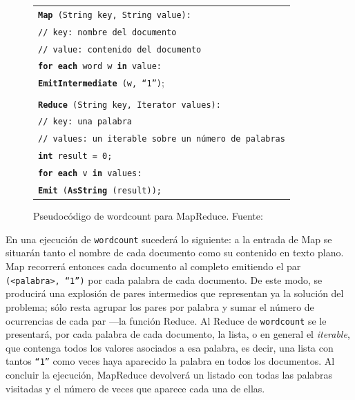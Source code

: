 \begin{figure}[tbp]
 \begin{center}
  \begin{tabular}{|l|}
   \hline
   \texttt{{\bf Map} (String key, String value):} \\
   \texttt{// key: nombre del documento} \\
   \texttt{// value: contenido del documento} \\
   \texttt{{\bf for each} word w {\bf in} value:} \\
   \texttt{{\bf EmitIntermediate} (w, ``1'')};\\ \\

   \texttt{{\bf Reduce} (String key, Iterator values):} \\
   \texttt{// key: una palabra} \\
   \texttt{// values: un iterable sobre un n\'umero de palabras} \\
   \texttt{{\bf int} result = 0;} \\
   \texttt{{\bf for each} v {\bf in} values:} \\
   \texttt{{\bf Emit} ({\bf AsString} (result));} \\
   \hline
  \end{tabular}
  \caption{Pseudoc\'odigo de wordcount para MapReduce. Fuente: \cite{googlemapreduce}}
  \label{fig:wordcount}
 \end{center}
\end{figure}

En una ejecuci\'on de \texttt{wordcount} suceder\'a lo siguiente: a la entrada de Map se situar\'an tanto el nombre de cada documento como su contenido en texto plano. Map recorrer\'a entonces cada documento al completo emitiendo el par \texttt{(<palabra>, ``1'')} por cada palabra de cada documento. De este modo, se producir\'a una explosi\'on de pares intermedios que representan ya la soluci\'on del problema; s\'olo resta agrupar los pares por palabra y sumar el n\'umero de ocurrencias de cada par ---la funci\'on Reduce. Al Reduce de \texttt{wordcount} se le presentar\'a, por cada palabra de cada documento, la lista, o en general el \emph{iterable}, que contenga todos los valores asociados a esa palabra, es decir, una lista con tantos \texttt{``1''} como veces haya aparecido la palabra en todos los documentos. Al concluir la ejecuci\'on, MapReduce devolver\'a un listado con todas las palabras visitadas y el n\'umero de veces que aparece cada una de ellas.



